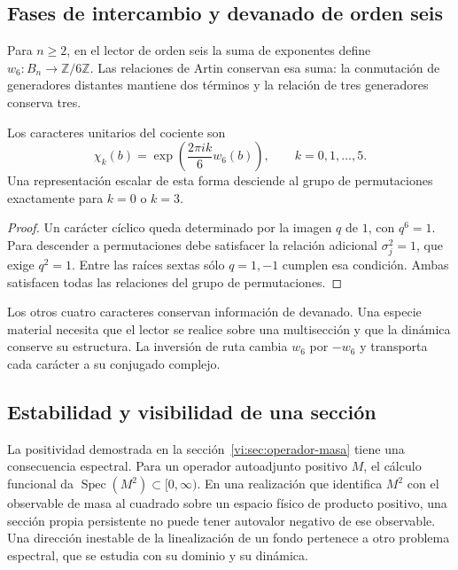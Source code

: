 \subsection{Fases de intercambio y devanado de orden seis}

Para \(n\ge2\), en el lector de orden seis la suma de exponentes define
$w_6:B_n\to\mathbb Z/6\mathbb Z$. Las relaciones de Artin
conservan esa suma: la conmutación de generadores distantes mantiene
dos términos y la relación de tres generadores conserva tres.

\begin{proposition}
\label{vi:prop:devanado-seis}
Los caracteres unitarios del cociente son
\[
 \chi_k(b)=\exp\!\left(\frac{2\pi i k}{6}w_6(b)\right),
 \qquad k=0,1,\ldots,5.
\]
Una representación escalar de esta forma desciende al grupo de
permutaciones exactamente para $k=0$ o $k=3$.
\end{proposition}
\begin{proof}
Un carácter cíclico queda determinado por la imagen $q$ de $1$,
con $q^6=1$. Para descender a permutaciones debe satisfacer la
relación adicional $\sigma_j^2=1$, que exige $q^2=1$.
Entre las raíces sextas sólo $q=1,-1$ cumplen esa condición.
Ambas satisfacen todas las relaciones del grupo de permutaciones.
\end{proof}

Los otros cuatro caracteres conservan información de devanado.
Una especie material necesita que el lector se realice sobre una
multisección y que la dinámica conserve su estructura. La inversión
de ruta cambia $w_6$ por $-w_6$ y transporta cada carácter a su
conjugado complejo.

\subsection{Estabilidad y visibilidad de una sección}

La positividad demostrada en la
sección~\ref{vi:sec:operador-masa} tiene una consecuencia espectral.
Para un operador autoadjunto positivo $M$, el cálculo funcional da
$\operatorname{Spec}(M^2)\subset[0,\infty)$. En una realización que
identifica $M^2$ con el observable de masa al cuadrado sobre un
espacio físico de producto positivo, una sección propia persistente
no puede tener autovalor negativo de ese observable. Una dirección
inestable de la linealización de un fondo pertenece a otro problema
espectral, que se estudia con su dominio y su dinámica.

